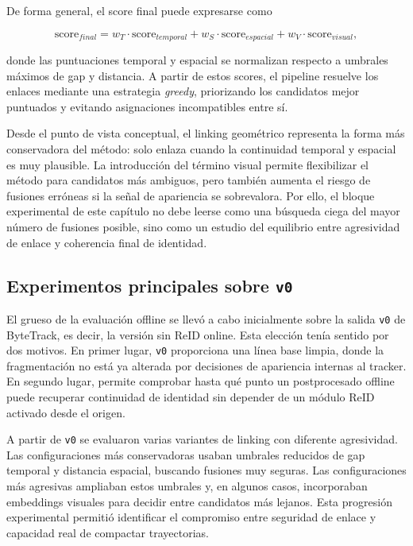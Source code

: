 \documentclass[../MAIN.tex]{subfiles}
\begin{document}
	De forma general, el score final puede expresarse como
	
	\[
	\mathrm{score}_{final} = w_T \cdot \mathrm{score}_{temporal} + w_S \cdot \mathrm{score}_{espacial} + w_V \cdot \mathrm{score}_{visual},
	\]
	
	donde las puntuaciones temporal y espacial se normalizan respecto a umbrales máximos de gap y distancia. A partir de estos scores, el pipeline resuelve los enlaces mediante una estrategia \textit{greedy}, priorizando los candidatos mejor puntuados y evitando asignaciones incompatibles entre sí.
	
	Desde el punto de vista conceptual, el linking geométrico representa la forma más conservadora del método: solo enlaza cuando la continuidad temporal y espacial es muy plausible. La introducción del término visual permite flexibilizar el método para candidatos más ambiguos, pero también aumenta el riesgo de fusiones erróneas si la señal de apariencia se sobrevalora. Por ello, el bloque experimental de este capítulo no debe leerse como una búsqueda ciega del mayor número de fusiones posible, sino como un estudio del equilibrio entre agresividad de enlace y coherencia final de identidad.
	
	\subsection{Experimentos principales sobre \texttt{v0}}
	
	El grueso de la evaluación offline se llevó a cabo inicialmente sobre la salida \texttt{v0} de ByteTrack, es decir, la versión sin ReID online. Esta elección tenía sentido por dos motivos. En primer lugar, \texttt{v0} proporciona una línea base limpia, donde la fragmentación no está ya alterada por decisiones de apariencia internas al tracker. En segundo lugar, permite comprobar hasta qué punto un postprocesado offline puede recuperar continuidad de identidad sin depender de un módulo ReID activado desde el origen.
	
	A partir de \texttt{v0} se evaluaron varias variantes de linking con diferente agresividad. Las configuraciones más conservadoras usaban umbrales reducidos de gap temporal y distancia espacial, buscando fusiones muy seguras. Las configuraciones más agresivas ampliaban estos umbrales y, en algunos casos, incorporaban embeddings visuales para decidir entre candidatos más lejanos. Esta progresión experimental permitió identificar el compromiso entre seguridad de enlace y capacidad real de compactar trayectorias.
	
\end{document}
